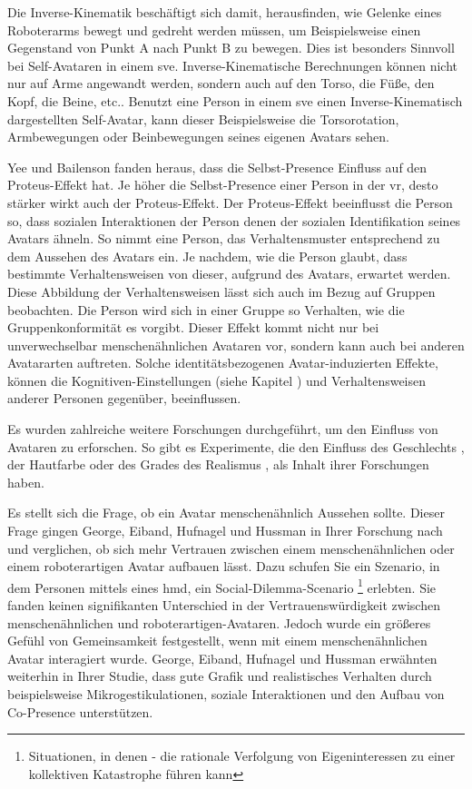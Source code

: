 \documentclass[a4paper,11pt]{article}%
\renewcommand{\\}{\vspace*{0.5\baselineskip} \newline}
\begin{document}
\label{inverseKinematik}
Die Inverse-Kinematik beschäftigt sich damit, herausfinden, wie Gelenke eines Roboterarms bewegt und gedreht werden müssen, um Beispielsweise einen Gegenstand von Punkt A nach Punkt B zu bewegen. Dies ist besonders Sinnvoll bei Self-Avataren in einem \ac{sve}. Inverse-Kinematische Berechnungen können nicht nur auf Arme angewandt werden, sondern auch auf den Torso, die Füße, den Kopf, die Beine, etc.. Benutzt eine Person in einem \ac{sve} einen Inverse-Kinematisch dargestellten Self-Avatar, kann dieser Beispielsweise die Torsorotation, Armbewegungen oder Beinbewegungen seines eigenen Avatars sehen.

Yee und Bailenson fanden heraus, dass die Selbst-Presence Einfluss auf den Proteus-Effekt hat. Je höher die Selbst-Presence einer Person in der \ac{vr}, desto stärker wirkt auch der Proteus-Effekt. Der Proteus-Effekt beeinflusst die Person so, dass sozialen Interaktionen der Person denen der sozialen Identifikation seines Avatars ähneln. So nimmt eine Person, das Verhaltensmuster entsprechend zu dem Aussehen des Avatars ein. Je nachdem, wie die Person glaubt, dass bestimmte Verhaltensweisen von dieser, aufgrund des Avatars, erwartet werden. \citep{ratan2015leveling} 
Diese Abbildung der Verhaltensweisen lässt sich auch im Bezug auf Gruppen beobachten. Die Person wird sich in einer Gruppe so Verhalten, wie die Gruppenkonformität es vorgibt.
Dieser Effekt kommt nicht nur bei unverwechselbar menschenähnlichen Avataren vor, sondern kann auch bei anderen Avatararten auftreten. Solche identitätsbezogenen Avatar-induzierten Effekte, können die \dq{}Kognitiven-Einstellungen\dq{} (siehe Kapitel \textit{}) und Verhaltensweisen anderer Personen gegenüber, beeinflussen. \citep{lok2003effects}

Es wurden zahlreiche weitere Forschungen durchgeführt, um den Einfluss von Avataren zu erforschen. So gibt es Experimente, die den Einfluss des Geschlechts \cite{slater2010first}, der Hautfarbe \cite{peck2013putting} oder des Grades des Realismus \cite{roth2016avatar}, als Inhalt ihrer Forschungen haben.

Es stellt sich die Frage, ob ein Avatar menschenähnlich Aussehen sollte. Dieser Frage gingen George, Eiband, Hufnagel und Hussman \cite{george2018trusting} in Ihrer Forschung nach und verglichen, ob sich mehr Vertrauen zwischen einem menschenähnlichen oder einem roboterartigen Avatar aufbauen lässt.
Dazu schufen Sie ein Szenario, in dem Personen mittels eines \ac{hmd}, ein Social-Dilemma-Scenario \footnote{Situationen, in denen - die rationale Verfolgung von Eigeninteressen zu einer kollektiven Katastrophe führen kann} erlebten. Sie fanden keinen signifikanten Unterschied in der Vertrauenswürdigkeit zwischen menschenähnlichen und roboterartigen-Avataren. Jedoch wurde ein größeres Gefühl von Gemeinsamkeit festgestellt, wenn mit einem menschenähnlichen Avatar interagiert wurde. \citep{kerr1983motivation}
George, Eiband, Hufnagel und Hussman erwähnten weiterhin in Ihrer Studie, dass gute Grafik und realistisches Verhalten durch beispielsweise Mikrogestikulationen, soziale Interaktionen und den Aufbau von \dq{}Co-Presence\dq{} unterstützen. \citep{george2018trusting}
\end{document}
